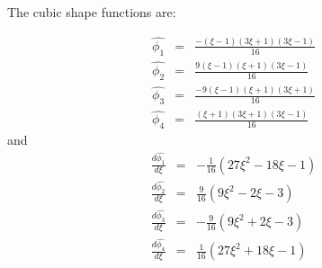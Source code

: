 \documentclass[paper=a4, fontsize=11pt]{article} %
\begin{document}
The cubic shape functions are:

\begin{eqnarray}
\hat{\phi_1} &=& \frac{-(\xi-1)(3\xi+1)(3\xi-1)}{16} \nonumber\\
\hat{\phi_2} &=& \frac{9(\xi-1)(\xi+1)(3\xi-1)}{16} \nonumber\\
\hat{\phi_3} &=& \frac{-9(\xi-1)(\xi+1)(3\xi+1)}{16} \nonumber\\
\hat{\phi_4} &=& \frac{(\xi+1)(3\xi+1)(3\xi-1)}{16}
\end{eqnarray}
and
\begin{eqnarray}
\frac{d\hat{\phi_1}}{d\xi} &=& -\frac{1}{16} (27\xi^2 - 18\xi -1) \nonumber\\
\frac{d\hat{\phi_2}}{d\xi} &=& \frac{9}{16} (9\xi^2 -2\xi -3) \nonumber\\
\frac{d\hat{\phi_3}}{d\xi} &=& -\frac{9}{16} (9\xi^2 + 2\xi -3) \nonumber\\
\frac{d\hat{\phi_4}}{d\xi} &=& \frac{1}{16} (27\xi^2 + 18\xi-1)      
\end{eqnarray}
\end{document}
